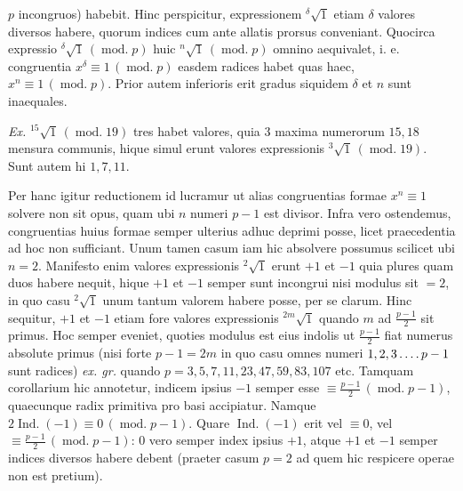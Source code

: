 $p$ incongruos) habebit. Hinc perspicitur, expressionem ${}^{\delta}\!\surd {1}$ etiam $\delta$ valores diversos habere, quorum indices cum ante allatis prorsus conveniant. Quocirca expressio ${}^{\delta}\!\surd {1}\,(\operatorname{mod.}p)$ huic ${}^{n}\!\surd {1}\,(\operatorname{mod.}p)$ omnino aequivalet, i. e. congruentia $x^\delta\equiv1\,(\operatorname{mod.}p)$ easdem radices habet quas haec, $x^n\equiv1\,(\operatorname{mod.}p)$. Prior autem inferioris erit gradus siquidem $\delta$ et $n$ sunt inaequales.

\emph{Ex.} ${}^{15}\!\surd {1}\,(\operatorname{mod.}19)$ tres habet valores, quia $3$ maxima numerorum $15,18$ mensura communis, hique simul erunt valores expressionis ${}^{3}\!\surd {1}\,(\operatorname{mod.}19)$. Sunt autem hi $1,7,11$.


Per hanc igitur reductionem id lucramur ut alias congruentias formae $x^n\equiv1$ solvere non sit opus, quam ubi $n$ numeri $p-1$ est divisor. Infra vero ostendemus, congruentias huius formae semper ulterius adhuc deprimi posse, licet praecedentia ad hoc non sufficiant. Unum tamen casum iam hic absolvere possumus scilicet ubi $n=2$. Manifesto enim valores expressionis ${}^{2}\!\surd {1}$ erunt $+1$ et $-1$ quia plures quam duos habere nequit, hique $+1$ et $-1$ semper sunt incongrui nisi modulus sit $=2$, in quo casu ${}^{2}\!\surd {1}$ unum tantum valorem habere posse, per se clarum. Hinc sequitur, $+1$ et $-1$ etiam fore valores expressionis ${}^{2m}\!\surd {1}$ quando $m$ ad $\frac{p-1}{2}$ sit primus. Hoc semper eveniet, quoties modulus est eius indolis ut $\frac{p-1}{2}$ fiat numerus absolute primus (nisi forte $p-1=2m$ in quo casu omnes numeri $1,2,3\mathinner{\ldotp\ldotp\ldotp\ldotp} p-1$ sunt radices) \emph{ex. gr.} quando $p=3,5,7,11,23,47,59,83,107$ etc. Tamquam corollarium hic annotetur, indicem ipsius $-1$ semper esse $\equiv\frac{p-1}{2}\,(\operatorname{mod.}p-1)$, quaecunque radix primitiva pro basi accipiatur. Namque $2\operatorname{Ind.}(-1)\equiv0\,(\operatorname{mod.}p-1)$. Quare $\operatorname{Ind.}(-1)$ erit vel $\equiv0$, vel $\equiv\frac{p-1}{2}\,(\operatorname{mod.}p-1)$: $0$ vero semper index ipsius $+1$, atque $+1$ et $-1$ semper indices diversos habere debent (praeter casum $p=2$ ad quem hic respicere operae non est pretium).


